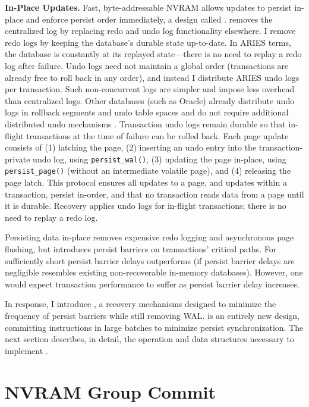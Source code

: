 \textbf{In-Place Updates.}
Fast, byte-addressable NVRAM allows updates to persist in-place and enforce persist order immediately, a design called \InPlace.
\InPlace removes the centralized log by replacing redo and undo log functionality elsewhere.
I remove redo logs by keeping the database's durable state up-to-date.
In ARIES terms, the database is constantly at its replayed state---there is no need to replay a redo log after failure.
Undo logs need not maintain a global order (transactions are already free to roll back in any order), and instead I distribute ARIES undo logs per transaction.
Such non-concurrent logs are simpler and impose less overhead than centralized logs.
Other databases (such as Oracle) already distribute undo logs in rollback segments and undo table spaces and do not require additional distributed undo mechanisms \cite{OracleDoc}.
Transaction undo logs remain durable so that in-flight transactions at the time of failure can be rolled back.
Each page update consists of (1) latching the page, (2) inserting an undo entry into the transaction-private undo log, using \texttt{persist\_wal()}, (3) updating the page in-place, using \texttt{persist\_page()} (without an intermediate volatile page), and (4) releasing the page latch.
This protocol ensures all updates to a page, and updates within a transaction, persist in-order, and that no transaction reads data from a page until it is durable.
Recovery applies undo logs for in-flight transactions; there is no need to replay a redo log.

Persisting data in-place removes expensive redo logging and asynchronous page flushing, but introduces persist barriers on transactions' critical paths.
For sufficiently short persist barrier delays \InPlace outperforms \NVDisk (if persist barrier delays are negligible \InPlace resembles existing non-recoverable in-memory databases).
However, one would expect transaction performance to suffer as persist barrier delay increases.

In response, I introduce \GroupCommit, a recovery mechanisms designed to minimize the frequency of persist barriers while still removing WAL.
\GroupCommit is an entirely new design, committing instructions in large batches to minimize persist synchronization.
The next section describes, in detail, the operation and data structures necessary to implement \GroupCommit.

\section{NVRAM Group Commit}
\label{sec:OLTP_design:GroupCommit}

